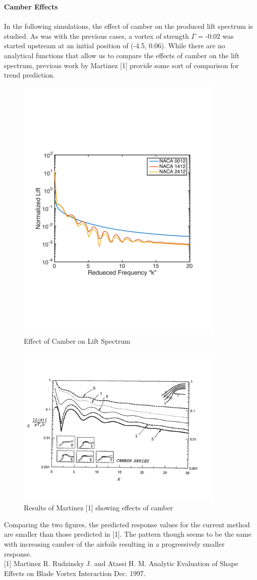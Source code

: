 \documentclass{article}
\begin{document}
\noindent \textbf{Camber Effects} \\ \\
In the following simulations, the effect of camber on the produced lift spectrum is studied. As was with the previous cases, a vortex of strength $\Gamma$ = -0.02 was started upstream at an initial position of (-4.5, 0.06). While there are no analytical functions that allow us to compare the effects of camber on the lift spectrum, previous work by Martinez [1] provide some sort of comparison for trend prediction. 

\begin{figure}[h]
\includegraphics[width = 4in, height = 3 in]{Camber_Compare}
\centering
\caption{Effect of Camber on Lift Spectrum}
\end{figure}

\begin{figure}[h]
\includegraphics[width = 4in, height = 2.5 in]{Martinez_Camber}
\centering
\caption{Results of Martinez [1] showing effects of camber}
\end{figure}

\noindent Comparing the two figures, the predicted response values for the current method are smaller than those predicted in [1]. The pattern though seems to be the same with increasing camber of the airfoils resulting in a progressively smaller response. \\


[1] Martinez  R.   Rudzinsky  J.   and Atassi  H.  M.    Analytic Evaluation of Shape Effects on Blade Vortex Interaction  Dec.  1997.
\end{document}
